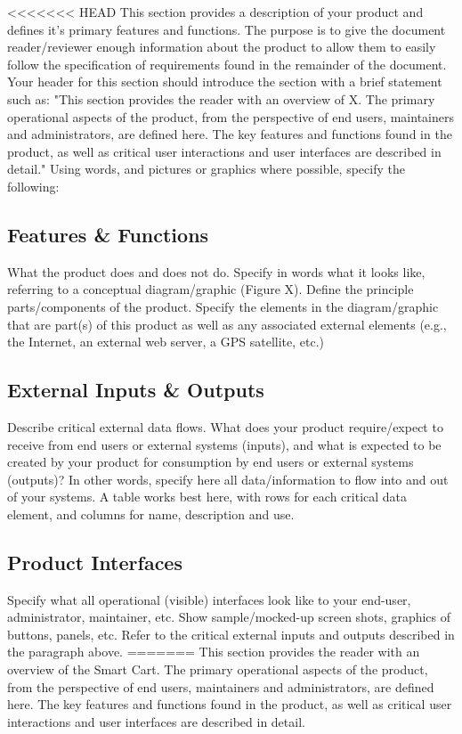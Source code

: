 <<<<<<< HEAD
This section provides a description of your product and defines it's primary features and functions. The purpose is to give the document reader/reviewer enough information about the product to allow them to easily follow the specification of requirements found in the remainder of the document. Your header for this section should introduce the section with a brief statement such as: "This section provides the reader with an overview of X. The primary operational aspects of the product, from the perspective of end users, maintainers and administrators, are defined here. The key features and functions found in the product, as well as critical user interactions and user interfaces are described in detail." Using words, and pictures or graphics where possible, specify the following:

\subsection{Features \& Functions}
What the product does and does not do. Specify in words what it looks like, referring to a conceptual diagram/graphic (Figure X).  Define the principle parts/components of the product. Specify the elements in the diagram/graphic that are part(s) of this product as well as any associated external elements (e.g., the Internet, an external web server, a GPS satellite, etc.)

\subsection{External Inputs \& Outputs}
Describe critical external data flows. What does your product require/expect to receive from end users or external systems (inputs), and what is expected to be created by your product for consumption by end users or external systems (outputs)? In other words, specify here all data/information to flow into and out of your systems. A table works best here, with rows for each critical data element, and columns for name, description and use.

\subsection{Product Interfaces}
Specify what all operational (visible) interfaces look like to your end-user, administrator, maintainer, etc. Show sample/mocked-up screen shots, graphics of buttons, panels, etc. Refer to the critical external inputs and outputs described in the paragraph above.
=======
This section provides the reader with an overview of the Smart Cart. The primary operational aspects of the product, from the perspective of end users, maintainers and administrators, are defined here. The key features and functions found in the product, as well as critical user interactions and user interfaces are described in detail.

